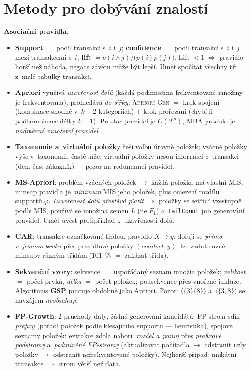 \documentclass[11pt,a4paper]{article}
\theoremstyle{definition}
\begin{document}
\section{Metody pro dobývání znalostí}
\textbf{Asociační pravidla.}
\begin{itemize}
\item \textbf{Support} $=$ podíl transakcí s~$i$ i~$j$; \textbf{confidence} $=$ podíl
 transakcí s~$i$ i~$j$ mezi transakcemi s~$i$; \textbf{lift}
 $=p(i\wedge j)/\big(p(i)p(j)\big)$. Lift $<1$ $\Rightarrow$ pravidlo horší než náhoda,
 negace závěru může být lepší. Umět spočítat všechny tři z~malé tabulky transakcí.
\item \textbf{Apriori} využívá \emph{uzavřenost dolů} (každá podmnožina frekventované množiny
 je frekventovaná), prohledává \emph{do šířky}; \textsc{Apriori-Gen} $=$ krok spojení
 (kombinace shodné v~$k-2$ kategoriích) $+$ krok prořezání (chybí-li podkombinace délky
 $k-1$). Prostor pravidel je $O(2^m)$, MBA produkuje \emph{nadměrné množství pravidel}.
\item \textbf{Taxonomie a~virtuální položky} řeší volbu úrovně položek; vzácné položky výše
 v~taxonomii, časté níže; virtuální položky nesou informaci o~transakci (den, čas,
 zákazník) --- pozor na redundanci pravidel.
\item \textbf{MS-Apriori}: problém vzácných položek $\to$ každá položka má vlastní
 $\mathrm{MIS}$, minsup pravidla je \emph{minimum} MIS jeho položek, plus omezení
 rozdílu supportů $\varphi$. \emph{Uzavřenost dolů přestává platit} $\Rightarrow$ položky
 se setřídí vzestupně podle MIS, používá se množina semen $L$ (ne $F_1$)
 a~\texttt{tailCount} pro generování pravidel. Umět uvést protipříklad k~uzavřenosti dolů.
\item \textbf{CAR}: transakce označkované třídou, pravidlo $X\to y$; dolují se
 \emph{přímo v~jednom kroku} přes pravidlové položky $(\mathit{condset},y)$; lze zadat
 různé minsupy různým třídám (101~\% $=$ zakázat třídu).
\item \textbf{Sekvenční vzory}: sekvence $=$ uspořádaný seznam množin položek;
 \emph{velikost} $=$ počet prvků, \emph{délka} $=$ počet položek; podsekvence přes
 vnořené inkluze. Algoritmus \textbf{GSP} pracuje obdobně jako Apriori. Pozor:
 $\langle\{3\}\{8\}\rangle$ a~$\langle\{3,8\}\rangle$ se navzájem \emph{neobsahují}.
\item \textbf{FP-Growth}: 2 průchody daty, žádné generování kandidátů; FP-strom sdílí
 \emph{prefixy} (pořadí položek podle klesajícího supportu --- heuristika), spojové
 seznamy položek; extrakce zdola nahoru \emph{rozděl a~panuj} přes \emph{prefixové
 podstromy} a~\emph{podmíněné FP-stromy} (aktualizovat počítadla $\to$ odstranit uzly
 položky $\to$ odstranit nefrekventované položky). Nejhorší případ: unikátní transakce
 $\Rightarrow$ strom větší než data.
\end{itemize}
\end{document}
